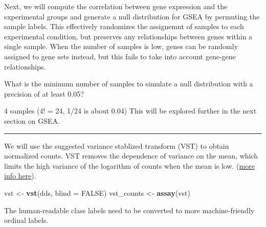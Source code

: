 \documentclass[
]{book}
\newenvironment{Shaded}{\begin{snugshade}}{\end{snugshade}}
\newcommand{\AttributeTok}[1]{\textcolor[rgb]{0.13,0.29,0.53}{#1}}
\newcommand{\ConstantTok}[1]{\textcolor[rgb]{0.56,0.35,0.01}{#1}}
\newcommand{\DecValTok}[1]{\textcolor[rgb]{0.00,0.00,0.81}{#1}}
\newcommand{\FunctionTok}[1]{\textcolor[rgb]{0.13,0.29,0.53}{\textbf{#1}}}
\newcommand{\NormalTok}[1]{#1}
\newcommand{\OtherTok}[1]{\textcolor[rgb]{0.56,0.35,0.01}{#1}}
\newcommand{\SpecialCharTok}[1]{\textcolor[rgb]{0.81,0.36,0.00}{\textbf{#1}}}
\begin{document}
Next, we will compute the correlation between gene expression and the experimental groups and generate a null distribution for GSEA
by permuting the sample labels. This effectively randomizes the assignemnt of samples
to each experimental condition, but preserves any relationships between genes within a single sample.
When the number of samples is low, genes can be randomly assigned to gene sets instead, but this fails to take into account gene-gene relationships.

What is the minimum number of samples to simulate a null distribution with a precision of at least 0.05?

4 samples (4! = 24, 1/24 is about 0.04) This will be explored further in the next section on GSEA.

\begin{center}\rule{0.5\linewidth}{0.5pt}\end{center}

We will use the suggested variance stablized transform (VST) to obtain normalized counts. VST removes the dependence of variance on the mean,
which limits the high variance of the logarithm of counts when the mean is low.
(\href{https://bioconductor.org/packages/devel/bioc/vignettes/DESeq2/inst/doc/DESeq2.html\#:~:text=transformations\%20and\%20visualization-,Count\%20data\%20transformations,-In\%20order\%20to}{more info here}).

\begin{Shaded}
\begin{Highlighting}[numbers=left,,]
\NormalTok{vst }\OtherTok{\textless{}{-}} \FunctionTok{vst}\NormalTok{(dds, }\AttributeTok{blind =} \ConstantTok{FALSE}\NormalTok{)}
\NormalTok{vst\_counts }\OtherTok{\textless{}{-}} \FunctionTok{assay}\NormalTok{(vst)}
\end{Highlighting}
\end{Shaded}

The human-readable class labels need to be converted to more machine-friendly ordinal labels.

\begin{Shaded}
\end{Shaded}
\end{document}
